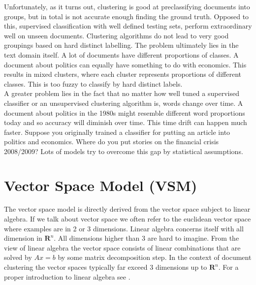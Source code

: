     Unfortunately, as it turns out, clustering is good at preclassifying documents into groups, but in total is not accurate enough finding the ground truth. Opposed to this, supervised classification with well defined testing sets, perform extraordinary well on unseen documents. Clustering algorithms do not lead to very good groupings based on hard distinct labelling. The problem ultimately lies in the text domain itself. A lot of documents have different proportions of classes. A document about politics can equally have something to do with economics. This results in mixed clusters, where each cluster represents proportions of different classes. This is too fuzzy to classify by hard distinct labels.\\

    A greater problem lies in the fact that no matter how well tuned a supervised classifier or an unsupervised clustering algorithm is, words change over time. A document about politics in the 1980s might resemble different word proportions today and so accuracy will diminish over time. This time drift can happen much faster. Suppose you originally trained a classifier for putting an article into politics and economics. Where do you put stories on the financial crisis 2008/2009? Lots of models try to overcome this gap by statistical assumptions.

\newpage{}
\section{Vector Space Model (VSM)}
\label{sec:vsm}

  \paragraph{}
    The vector space model is directly derived from the vector space subject to linear algebra. If we talk about vector space we often refer to the euclidean vector space where examples are in 2 or 3 dimensions. Linear algebra concerns itself with all dimension in $\mathbf{R}^{n}$. All dimensions higher than 3 are hard to imagine. From the view of linear algebra the vector space consists of linear combinations that are solved by $Ax = b$ by some matrix decomposition step. In the context of document clustering the vector spaces typically far exceed 3 dimensions up to $\mathbf{R}^{n}$. For a proper introduction to linear algebra see \cite{Strang2009}.

